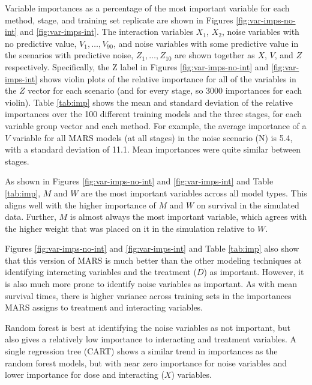\documentclass[12pt]{article}
\begin{document}
Variable importances as a percentage of the most important variable for each method, stage, and training set replicate are shown in Figures \ref{fig:var-imps-no-int} and \ref{fig:var-imps-int}. The interaction variables $X_{1}$, $X_{2}$, noise variables with no predictive value, $V_{1}, \ldots, V_{90}$, and noise variables with some predictive value in the scenarios with predictive noise, $Z_{1}, \ldots, Z_{10}$ are shown together as $X$, $V$, and $Z$ respectively. Specifically, the Z label in Figures \ref{fig:var-imps-no-int} and \ref{fig:var-imps-int} shows violin plots of the relative importance for all of the variables in the $Z$ vector for each scenario (and for every stage, so 3000 importances for each violin). Table \ref{tab:imp} shows the mean and standard deviation of the relative importances over the 100 different training models and the three stages, for each variable group vector and each method. For example, the average importance of a $V$ variable for all MARS models (at all stages) in the noise scenario (N) is 5.4, with a standard deviation of 11.1. Mean importances were quite similar between stages.

As shown in Figures \ref{fig:var-imps-no-int} and \ref{fig:var-imps-int} and Table \ref{tab:imp}, $M$ and $W$ are the most important variables across all model types. This aligns well with the higher importance of $M$ and $W$ on survival in the simulated data. Further, $M$ is almost always the most important variable, which agrees with the higher weight that was placed on it in the simulation relative to $W$.

Figures \ref{fig:var-imps-no-int} and \ref{fig:var-imps-int} and Table \ref{tab:imp} also show that this version of MARS is much better than the other modeling techniques at identifying interacting variables and the treatment ($D$) as important. However, it is also much more prone to identify noise variables as important. As with mean survival times, there is higher variance across training sets in the importances MARS assigns to treatment and interacting variables. 

Random forest is best at identifying the noise variables as not important, but also gives a relatively low importance to interacting and treatment variables. A single regression tree (CART) shows a similar trend in importances as the random forest models, but with near zero importance for noise variables and lower importance for dose and interacting ($X$) variables.
\end{document}

